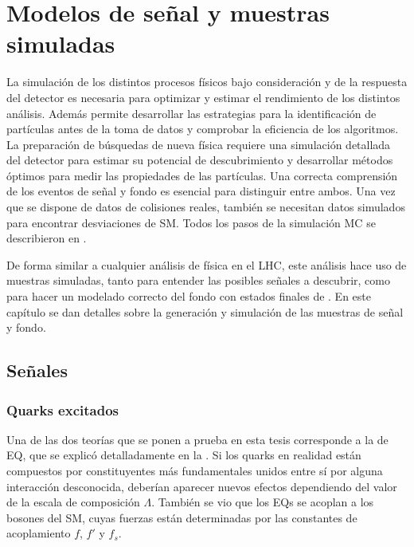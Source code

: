\chapter{Modelos de señal y muestras simuladas}
\label{ch:samples}


La simulación de los distintos procesos físicos bajo consideración y de la respuesta del detector es necesaria para optimizar y estimar el rendimiento de los distintos análisis. Además permite desarrollar las estrategias para la identificación de partículas antes de la toma de datos y comprobar la eficiencia de los algoritmos. La preparación de búsquedas de nueva física requiere una simulación detallada del detector para estimar su potencial de descubrimiento y desarrollar métodos óptimos para medir las propiedades de las partículas. Una correcta comprensión de los eventos de señal y fondo es esencial para distinguir entre ambos. Una vez que se dispone de datos de colisiones reales, también se necesitan datos simulados para encontrar desviaciones de \ac{SM}. Todos los pasos de la simulación \ac{MC} se describieron en \Sect{\ref{sec:theory:mc_simulation}}.

De forma similar a cualquier análisis de física en el \ac{LHC}, este análisis hace uso de muestras simuladas, tanto para entender las posibles señales a descubrir, como para hacer un modelado correcto del fondo con estados finales de \gammajet.
En este capítulo se dan detalles sobre la generación y simulación de las muestras de señal y fondo.


\section{Señales}
\label{sec:samples:samples:sig}

\subsection{Quarks excitados}
\label{subsec:samples:samples:sig:qstar}

Una de las dos teorías que se ponen a prueba en esta tesis corresponde a la de \acf{EQ}, que se explicó detalladamente en la \Sect{\ref{subsec:theory:bsm:qstar}}. Si los quarks en realidad están compuestos por constituyentes más fundamentales unidos entre sí por alguna interacción desconocida, deberían aparecer nuevos efectos dependiendo del valor de la escala de composición \(\Lambda\).
También se vio que los \acp{EQ} se acoplan a los bosones del \ac{SM}, cuyas fuerzas están determinadas por las constantes de acoplamiento \(f\), \(f'\) y \(f_s\).


